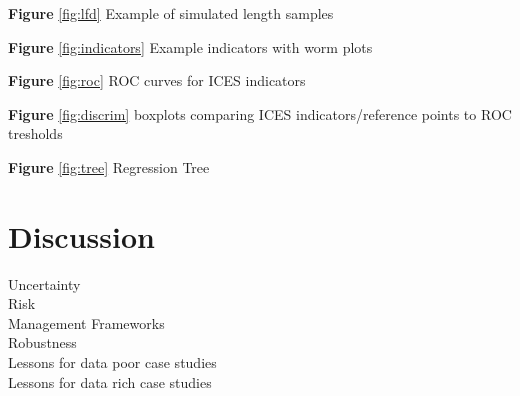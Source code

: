 \documentclass[12pt,doublespacing,a4paper]{ouparticle}
\begin{document}
\textbf{Figure} \ref{fig:lfd} Example of simulated length samples 

\textbf{Figure} \ref{fig:indicators} Example indicators with worm plots

\textbf{Figure} \ref{fig:roc} ROC curves for ICES indicators

\textbf{Figure} \ref{fig:discrim} boxplots comparing ICES indicators/reference points to ROC tresholds

\textbf{Figure} \ref{fig:tree} Regression Tree


\section{Discussion}


\begin{description}
 \item[Uncertainty]  
 \item[Risk]     
 \item[Management Frameworks] 
 \item[Robustness]
 \item[Lessons for data poor case studies]  
 \item[Lessons for data rich case studies] 
\end{description}


\end{document}
